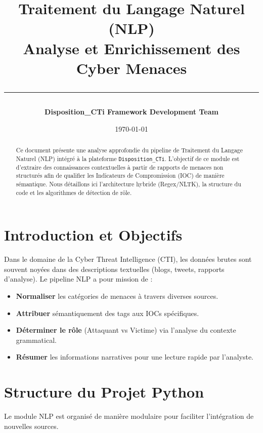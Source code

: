 \documentclass[12pt,a4paper]{article}
\title{
    \vspace{-2cm}
    \textbf{\huge Traitement du Langage Naturel (NLP)}\\
    \large Analyse et Enrichissement des Cyber Menaces\\
    \vspace{0.5cm}
    \rule{\linewidth}{0.5mm}
}
\author{\textbf{Disposition\_CTi Framework Development Team}}
\date{\today}
\begin{document}
\maketitle

\begin{abstract}
Ce document présente une analyse approfondie du pipeline de Traitement du Langage Naturel (NLP) intégré à la plateforme \texttt{Disposition\_CTi}. L'objectif de ce module est d'extraire des connaissances contextuelles à partir de rapports de menaces non structurés afin de qualifier les Indicateurs de Compromission (IOC) de manière sémantique. Nous détaillons ici l'architecture hybride (Regex/NLTK), la structure du code et les algorithmes de détection de rôle.
\end{abstract}

\tableofcontents
\newpage

\section{Introduction et Objectifs}
Dans le domaine de la Cyber Threat Intelligence (CTI), les données brutes sont souvent noyées dans des descriptions textuelles (blogs, tweets, rapports d'analyse). Le pipeline NLP a pour mission de :
\begin{itemize}
    \item \textbf{Normaliser} les catégories de menaces à travers diverses sources.
    \item \textbf{Attribuer} sémantiquement des tags aux IOCs spécifiques.
    \item \textbf{Déterminer le rôle} (Attaquant vs Victime) via l'analyse du contexte grammatical.
    \item \textbf{Résumer} les informations narratives pour une lecture rapide par l'analyste.
\end{itemize}

\section{Structure du Projet Python}
Le module NLP est organisé de manière modulaire pour faciliter l'intégration de nouvelles sources.
\end{document}
